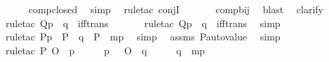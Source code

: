\begin{isabellebody}
\ \ \ \ \isamarkupfalse%
\ comp{\isacharunderscore}{\kern0pt}closed\ \isamarkupfalse%
\ simp\ \isamarkupfalse%
\ {\isacharparenleft}{\kern0pt}rule{\isacharunderscore}{\kern0pt}tac\ conjI{\isacharparenright}{\kern0pt}\ \isanewline
\ \ \ \ \isamarkupfalse%
\ comp{\isacharunderscore}{\kern0pt}bij\ \isamarkupfalse%
\ blast\ \isamarkupfalse%
\ clarify\ \isamarkupfalse%
\ {\isacharparenleft}{\kern0pt}rule{\isacharunderscore}{\kern0pt}tac\ Q{\isacharequal}{\kern0pt}{\isachardoublequoteopen}{\isasympi}{\isacharbackquote}{\kern0pt}{\isacharparenleft}{\kern0pt}{\isasymtau}{\isacharbackquote}{\kern0pt}p{\isacharparenright}{\kern0pt}\ {\isasympreceq}\ {\isasympi}{\isacharbackquote}{\kern0pt}{\isacharparenleft}{\kern0pt}{\isasymtau}{\isacharbackquote}{\kern0pt}q{\isacharparenright}{\kern0pt}{\isachardoublequoteclose}\ \ iff{\isacharunderscore}{\kern0pt}trans{\isacharparenright}{\kern0pt}\ \isanewline
\ \ \ \ \isamarkupfalse%
\ {\isacharparenleft}{\kern0pt}rule{\isacharunderscore}{\kern0pt}tac\ Q{\isacharequal}{\kern0pt}{\isachardoublequoteopen}{\isacharparenleft}{\kern0pt}{\isasymtau}{\isacharbackquote}{\kern0pt}p{\isacharparenright}{\kern0pt}\ {\isasympreceq}\ {\isacharparenleft}{\kern0pt}{\isasymtau}{\isacharbackquote}{\kern0pt}q{\isacharparenright}{\kern0pt}{\isachardoublequoteclose}\ \ iff{\isacharunderscore}{\kern0pt}trans{\isacharparenright}{\kern0pt}\ \isamarkupfalse%
\ simp\ \isanewline
\ \ \ \ \isamarkupfalse%
\ {\isacharparenleft}{\kern0pt}rule{\isacharunderscore}{\kern0pt}tac\ P{\isacharequal}{\kern0pt}{\isachardoublequoteopen}{\isasymtau}{\isacharbackquote}{\kern0pt}p\ {\isasymin}\ P\ {\isasymand}\ {\isasymtau}{\isacharbackquote}{\kern0pt}q\ {\isasymin}\ P{\isachardoublequoteclose}\ \ mp{\isacharparenright}{\kern0pt}\ \isamarkupfalse%
\ simp\ \isamarkupfalse%
\ assms\ P{\isacharunderscore}{\kern0pt}auto{\isacharunderscore}{\kern0pt}value\ \isamarkupfalse%
\ simp\isanewline
\ \ \ \ \isamarkupfalse%
\ {\isacharparenleft}{\kern0pt}rule{\isacharunderscore}{\kern0pt}tac\ P{\isacharequal}{\kern0pt}{\isachardoublequoteopen}{\isacharparenleft}{\kern0pt}{\isasympi}\ O\ {\isasymtau}{\isacharparenright}{\kern0pt}{\isacharbackquote}{\kern0pt}\ p\ {\isacharequal}{\kern0pt}\ {\isasympi}\ {\isacharbackquote}{\kern0pt}\ {\isacharparenleft}{\kern0pt}{\isasymtau}\ {\isacharbackquote}{\kern0pt}\ p{\isacharparenright}{\kern0pt}\ {\isasymand}\ {\isacharparenleft}{\kern0pt}{\isasympi}\ O\ {\isasymtau}{\isacharparenright}{\kern0pt}{\isacharbackquote}{\kern0pt}\ q\ {\isacharequal}{\kern0pt}\ {\isasympi}\ {\isacharbackquote}{\kern0pt}\ {\isacharparenleft}{\kern0pt}{\isasymtau}\ {\isacharbackquote}{\kern0pt}\ q{\isacharparenright}{\kern0pt}{\isachardoublequoteclose}\ \ mp{\isacharparenright}{\kern0pt}\ \isamarkupfalse%

\end{isabellebody}
